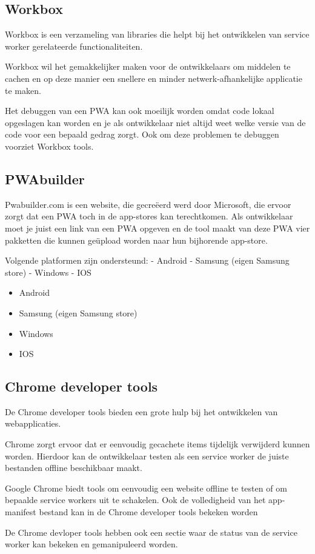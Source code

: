 		

\subsection{Workbox}

	Workbox is een verzameling van libraries die helpt bij het ontwikkelen van service worker gerelateerde functionaliteiten.
	
	Workbox wil het gemakkelijker maken voor de ontwikkelaars om middelen te cachen en op deze manier een snellere en minder netwerk-afhankelijke applicatie te maken.
	
	Het debuggen van een PWA kan ook moeilijk worden omdat code lokaal opgeslagen kan worden en je als ontwikkelaar niet altijd weet welke versie van de code voor een bepaald gedrag zorgt. Ook om deze problemen te debuggen voorziet Workbox tools.
	\autocite{Workbox2020}
	

\subsection{PWAbuilder}

	Pwabuilder.com is een website, die gecreëerd werd door Microsoft, die ervoor zorgt dat een PWA toch in de app-stores kan terechtkomen. Als ontwikkelaar moet je juist een link van een PWA opgeven en de tool maakt van deze PWA vier pakketten die kunnen geüpload worden naar hun bijhorende app-store. 
	
	Volgende platformen zijn ondersteund:
	-	Android
	-	Samsung (eigen Samsung store)
	-	Windows
	-	IOS
	
	\begin{itemize}
		\item	Android
		\item	Samsung (eigen Samsung store)
		\item	Windows
		\item	IOS
	\end{itemize}
	\autocite{PWAbuilder2020}
	
	
\subsection{Chrome developer tools}
	De Chrome developer tools bieden een grote hulp bij het ontwikkelen van webapplicaties.
	
	Chrome zorgt ervoor dat er eenvoudig gecachete items tijdelijk verwijderd kunnen worden. Hierdoor kan de ontwikkelaar testen als een service worker de juiste bestanden offline beschikbaar maakt.
	
	Google Chrome biedt tools om eenvoudig een website offline te testen of om bepaalde service workers uit te schakelen.
	Ook de volledigheid van het app-manifest bestand kan in de Chrome developer tools bekeken worden
	
	De Chrome devloper tools hebben ook een sectie waar de status van de service worker kan bekeken en gemanipuleerd worden.
	\autocite{Developers2019b}
	

	
	